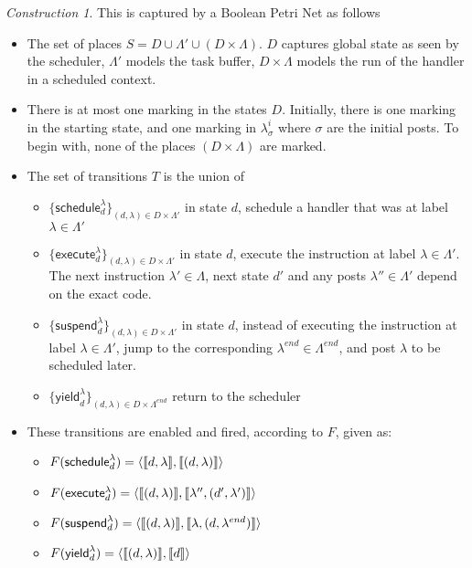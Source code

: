 \documentclass{article}
\theoremstyle{remark}
\newtheorem{construction}{Construction}[section]
\DeclarePairedDelimiter{\multiset}{\llbracket}{\rrbracket}
\DeclarePairedDelimiter{\pair}{\langle}{\rangle}
\newcommand{\schedule}[2]{\mathsf{schedule}^{#1}_{#2}}
\newcommand{\execute}[2]{\mathsf{execute}^{#1}_{#2}}
\newcommand{\suspend}[2]{\mathsf{suspend}^{#1}_{#2}}
\newcommand{\yield}[2]{\mathsf{yield}^{#1}_{#2}}
\begin{document}
\begin{construction}
This is captured by a Boolean Petri Net as follows
\begin{itemize}
\item The set of places $S = D \cup \Lambda' \cup (D \times \Lambda)$. $D$ captures global state as seen by the scheduler, $\Lambda'$ models the task buffer, $D \times \Lambda$ models the run of the handler in a scheduled context.
\item There is at most one marking in the states $D$. Initially, there is one marking in the starting state, and one marking in $\lambda^i_{\sigma}$ where $\sigma$ are the initial posts. To begin with, none of the places $(D \times \Lambda)$ are marked.
\item The set of transitions $T$ is the union of 
\begin{itemize}
\item $\{\schedule{\lambda}{d}\}_{(d, \lambda) \in D \times \Lambda'}$ in state $d$, schedule a handler that was at label $\lambda \in \Lambda'$
\item $\{\execute{\lambda}{d}\}_{(d, \lambda) \in D \times \Lambda'}$ in state $d$, execute the instruction at label $\lambda \in \Lambda'$. The next instruction $\lambda' \in \Lambda$, next state $d'$ and any posts $\lambda'' \in \Lambda'$ depend on the exact code.
\item  $\{\suspend{\lambda}{d}\}_{(d, \lambda) \in D \times \Lambda'}$ in state $d$, instead of executing the instruction at label $\lambda \in \Lambda'$, jump to the corresponding $\lambda^{end}\in \Lambda^{end}$, and post $\lambda$ to be scheduled later.
\item  $\{\yield{\lambda}{d}\}_{(d, \lambda) \in D \times \Lambda^{end}}$ return to the scheduler
\end{itemize}
\item These transitions are enabled and fired, according to $F$, given as:
\begin{itemize}
\item $F(\schedule{\lambda}{d}) = \pair{\multiset{d, \lambda}, \multiset{(d, \lambda)}}$
\item $F(\execute{\lambda}{d}) = \pair{\multiset{(d, \lambda)}, \multiset{\lambda'', (d', \lambda')}}$
\item $F(\suspend{\lambda}{d}) = \pair{\multiset{(d, \lambda)}, \multiset{\lambda, (d, \lambda^{end})}}$
\item $F(\yield{\lambda}{d}) = \pair{\multiset{(d, \lambda)}, \multiset{d}}$
\end{itemize}
\end{itemize}
\end{construction}
\end{document}
